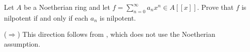 \begin{exercise}
Let \(A\) be a Noetherian ring and let \(f = \sum_{n=0}^\infty a_n x^n \in A[[x]]\).
Prove that \(f\) is nilpotent if and only if each \(a_n\) is nilpotent.
\end{exercise}

\begin{solution}
($\Rightarrow$) This direction follows from , which does not use the Noetherian assumption.


\end{solution}